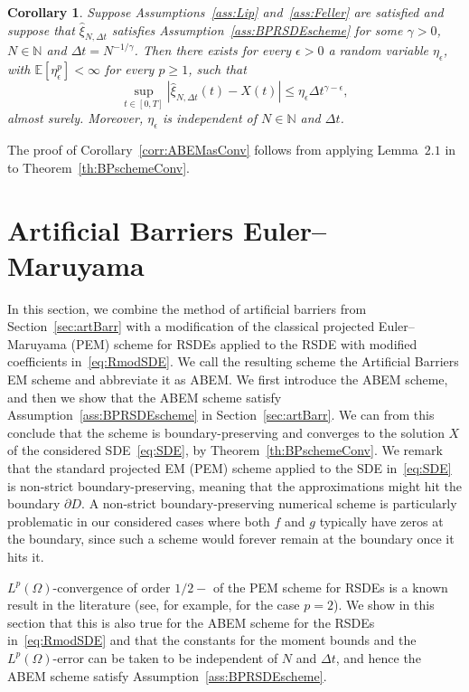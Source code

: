\documentclass[11pt]{amsart}
\newtheorem{corollary}[theorem]{Corollary}
\newcommand{\E}{{\mathbb E}}
\begin{document}
{\begin{corollary}\label{corr:BPschemeConv}
Suppose Assumptions~\ref{ass:Lip} and~\ref{ass:Feller} are satisfied and suppose that $\hat{\xi}_{N,\Delta t}$ satisfies Assumption~\ref{ass:BPRSDEscheme} for some $\gamma>0$, $N \in \mathbb{N}$ and $\Delta t = N^{-1/\gamma}$. Then there exists for every $\epsilon>0$ a random variable $\eta_{\epsilon}$, with $\E \left[ \eta_{\epsilon}^{p} \right] < \infty$ for every $p \geq 1$, such that
\begin{equation*}
\sup_{t \in [0,T]} |\hat{\xi}_{N,\Delta t}(t) - X(t)| \leq \eta_{\epsilon} \Delta t^{\gamma - \epsilon},
\end{equation*}
almost surely. Moreover, $\eta_{\epsilon}$ is independent of $N \in \mathbb{N}$ and $\Delta t$.
\end{corollary}
The proof of Corollary~\ref{corr:ABEMasConv} follows from applying Lemma~$2.1$ in \cite{MR2320830} to Theorem~\ref{th:BPschemeConv}.

\section{Artificial Barriers Euler--Maruyama}\label{sec:ABEM}
In this section, we combine the method of artificial barriers from Section~\ref{sec:artBarr} with a modification of the classical projected Euler--Maruyama (PEM) scheme for RSDEs applied to the RSDE with modified coefficients in~\eqref{eq:RmodSDE}. We call the resulting scheme the Artificial Barriers EM scheme and abbreviate it as ABEM. We first introduce the ABEM scheme, and then we show that the ABEM scheme satisfy Assumption~\ref{ass:BPRSDEscheme} in Section~\ref{sec:artBarr}. We can from this conclude that the scheme is boundary-preserving and converges to the solution $X$ of the considered SDE~\eqref{eq:SDE}, by Theorem~\ref{th:BPschemeConv}.
We remark that the standard projected EM (PEM) scheme applied to the SDE in~\eqref{eq:SDE} is non-strict boundary-preserving, meaning that the approximations might hit the boundary $\partial D$. A non-strict boundary-preserving numerical scheme is particularly problematic in our considered cases where both $f$ and $g$ typically have zeros at the boundary, since such a scheme would forever remain at the boundary once it hits it.

$L^{p}(\Omega)$-convergence of order $1/2-$ of the PEM scheme for RSDEs is a known result in the literature (see, for example, \cite{MR1357657} for the case $p=2$). We show in this section that this is also true for the ABEM scheme for the RSDEs in~\eqref{eq:RmodSDE} and that the constants for the moment bounds and the $L^{p}(\Omega)$-error can be taken to be independent of $N$ and $\Delta t$, and hence the ABEM scheme satisfy Assumption~\ref{ass:BPRSDEscheme}. 

}
\end{document}

